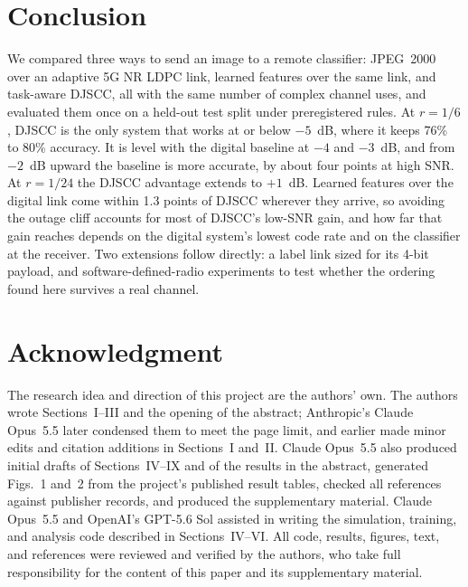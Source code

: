 \documentclass[conference]{IEEEtran}
\begin{document}
\section{Conclusion}
We compared three ways to send an image to a remote classifier: JPEG~2000 over an adaptive 5G NR LDPC link, learned features over the same link, and task-aware DJSCC, all with the same number of complex channel uses, and evaluated them once on a held-out test split under preregistered rules. At $r=1/6$, DJSCC is the only system that works at or below $-5$~dB, where it keeps 76\% to 80\% accuracy. It is level with the digital baseline at $-4$ and $-3$~dB, and from $-2$~dB upward the baseline is more accurate, by about four points at high SNR. At $r=1/24$ the DJSCC advantage extends to $+1$~dB. Learned features over the digital link come within 1.3 points of DJSCC wherever they arrive, so avoiding the outage cliff accounts for most of DJSCC's low-SNR gain, and how far that gain reaches depends on the digital system's lowest code rate and on the classifier at the receiver. Two extensions follow directly: a label link sized for its 4-bit payload, and software-defined-radio experiments to test whether the ordering found here survives a real channel.

\section*{Acknowledgment}
The research idea and direction of this project are the authors' own. The authors wrote Sections~I--III and the opening of the abstract; Anthropic's Claude Opus~5.5 later condensed them to meet the page limit, and earlier made minor edits and citation additions in Sections~I and~II. Claude Opus~5.5 also produced initial drafts of Sections~IV--IX and of the results in the abstract, generated Figs.~1 and~2 from the project's published result tables, checked all references against publisher records, and produced the supplementary material. Claude Opus~5.5 and OpenAI's GPT-5.6 Sol assisted in writing the simulation, training, and analysis code described in Sections~IV--VI. All code, results, figures, text, and references were reviewed and verified by the authors, who take full responsibility for the content of this paper and its supplementary material.
\end{document}
